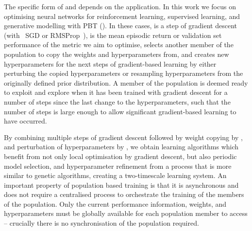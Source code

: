 The specific form of \pbtexploit and \pbtexplore depends on the application. In this work we focus on optimising neural networks for reinforcement learning, supervised learning, and generative modelling with PBT ().
In these cases, \pbtstep is a step of gradient descent (with \eg~SGD or RMSProp~\citep{tieleman2012lecture}), \pbteval is the mean episodic return or validation set performance of the metric we aim to optimise, \pbtexploit selects another member of the population to copy the weights and hyperparameters from, and \pbtexplore creates new hyperparameters for the next steps of gradient-based learning by either perturbing the copied hyperparameters or resampling hyperparameters from the originally defined prior distribution. A member of the population is deemed ready to exploit and explore when it has been trained with gradient descent for a number of steps since the last change to the hyperparameters, such that the number of steps is large enough to allow significant gradient-based learning to have occurred.

By combining multiple steps of gradient descent followed by weight copying by \pbtexploit, and perturbation of hyperparameters by \pbtexplore, we obtain learning algorithms which benefit from not only local optimisation by gradient descent, but also periodic model selection, and hyperparameter refinement from a process that is more similar to genetic algorithms, creating a two-timescale learning system.
%
An important property of population based training is that it is asynchronous and does not require a centralised process to orchestrate the training of the members of the population. Only the current performance information, weights, and hyperparameters must be globally available for each population member to access -- crucially there is no synchronisation of the population required.
